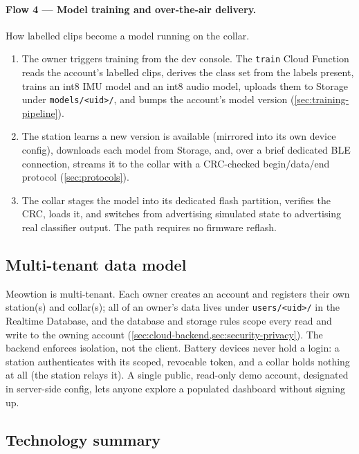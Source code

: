 \paragraph{Flow 4 --- Model training and over-the-air delivery.}
How labelled clips become a model running on the collar.
\begin{enumerate}[leftmargin=1.6em,itemsep=2pt]
  \item The owner triggers training from the dev console. The \texttt{train} Cloud Function reads the
        account's labelled clips, derives the class set from the labels present, trains an int8 IMU
        model and an int8 audio model, uploads them to Storage under \texttt{models/<uid>/}, and bumps
        the account's model version (\cref{sec:training-pipeline}).
  \item The station learns a new version is available (mirrored into its own device config), downloads
        each model from Storage, and, over a brief dedicated BLE connection, streams it to the collar
        with a CRC-checked begin/data/end protocol (\cref{sec:protocols}).
  \item The collar stages the model into its dedicated flash partition, verifies the CRC, loads it,
        and switches from advertising simulated state to advertising real classifier output. The path
        requires no firmware reflash.
\end{enumerate}

\subsection{Multi-tenant data model}

Meowtion is multi-tenant. Each owner creates an account and registers their own station(s) and
collar(s); all of an owner's data lives under \texttt{users/<uid>/} in the Realtime Database, and the
database and storage rules scope every read and write to the owning account
(\cref{sec:cloud-backend,sec:security-privacy}). The backend enforces isolation, not the client.
Battery devices never hold a login: a station authenticates with its scoped, revocable token, and a
collar holds nothing at all (the station relays it). A single public, read-only demo account,
designated in server-side config, lets anyone explore a populated dashboard without signing up.

\subsection{Technology summary}

